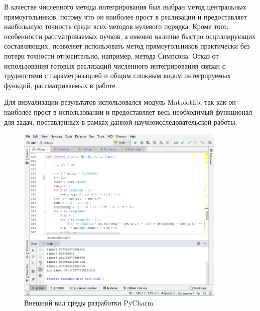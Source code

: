 {	В качестве численного метода интегрирования был выбран метод
центральных прямоугольников, потому что он наиболее прост в реализации и
предоставляет наибольшую точность среди всех методов нулевого порядка. Кроме того, особенности рассматриваемых пучков, а именно наличие быстро осциллирующих составляющих, позволяет использовать метод прямоугольников практически без потери точности относительно, например, метода Симпсона.
Отказ от использования готовых реализаций численного интегрирования связан
с трудностями с параметризацией и общим сложным видом интегрируемых
функций, рассматриваемых в работе.

	Для визуализации результатов использовался модуль Matplotlib\cite{plt},
так как он наиболее прост в использовании и предоставляет весь
необходимый функционал для задач, поставленных в рамках данной научноисследовательской работы.

		 \begin{figure}[H]
		  \begin{center}
			\includegraphics[width=10cm]{plots/pycharm1}
						\vspace{0.4cm}
	\caption{Внешний вид среды разработки PyCharm}
	\label{pycharm}
		 \end{center}
	

\end{figure}}
